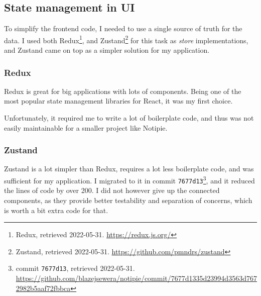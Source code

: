 \subsection{State management in UI}\label{state-management-in-ui}

To simplify the frontend code, I needed to use a single source of truth
for the data. I used both Redux\footnote{Redux, retrieved 2022-05-31.
\url{https://redux.js.org/}}, and Zustand\footnote{Zustand, retrieved
2022-05-31. \url{https://github.com/pmndrs/zustand}} for this task as
\emph{store} implementations, and Zustand came on top as a simpler
solution for my application.

\subsubsection{Redux}\label{redux}

Redux is great for big applications with lots of components. Being one
of the most popular state management libraries for React, it was my
first choice.

Unfortunately, it required me to write a lot of boilerplate code, and
thus was not easily maintainable for a smaller project like Notipie.

\subsubsection{Zustand}\label{zustand}

Zustand is a lot simpler than Redux, requires a lot less boilerplate
code, and was sufficient for my application. I migrated to it in commit
\texttt{7677d13}\footnote{commit \texttt{7677d13}, retrieved 2022-05-31.
\url{https://github.com/blazejsewera/notipie/commit/7677d1335d23994d3563d7672982b5aaf72fbbca}},
and it reduced the lines of code by over 200. I did not however give up
the connected components, as they provide better testability and
separation of concerns, which is worth a bit extra code for that.
